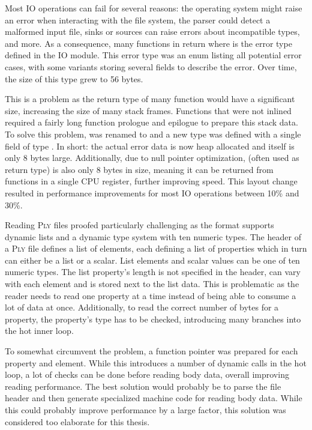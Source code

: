 Most IO operations can fail for several reasons: the operating system might raise an error when interacting with the file system, the parser could detect a malformed input file, sinks or sources can raise errors about incompatible types, and more.
As a consequence, many functions in  return  where  is the error type defined in the IO module.
This error type was an enum listing all potential error cases, with some variants storing several fields to describe the error.
Over time, the size of this type grew to 56 bytes.

This is a problem as the return type of many function would have a significant size, increasing the size of many stack frames.
Functions that were not inlined required a fairly long function prologue and epilogue to prepare this stack data.
To solve this problem,  was renamed to  and a new type  was defined with a single field of type .
In short: the actual error data is now heap allocated and  itself is only 8 bytes large.
Additionally, due to null pointer optimization,  (often used as return type) is also only 8 bytes in size, meaning it can be returned from functions in a single CPU register, further improving speed.
This layout change resulted in performance improvements for most IO operations between 10\% and 30\%.

Reading \textsc{Ply} files proofed particularly challenging as the format supports dynamic lists and a dynamic type system with ten numeric types.
The header of a \textsc{Ply} file defines a list of elements, each defining a list of properties which in turn can either be a list or a scalar.
List elements and scalar values can be one of ten numeric types.
The list property's length is not specified in the header, can vary with each element and is stored next to the list data.
This is problematic as the reader needs to read one property at a time instead of being able to consume a lot of data at once.
Additionally, to read the correct number of bytes for a property, the property's type has to be checked, introducing many branches into the hot inner loop.

To somewhat circumvent the problem, a function pointer was prepared for each property and element.
While this introduces a number of dynamic calls in the hot loop, a lot of checks can be done before reading body data, overall improving reading performance.
The best solution would probably be to parse the file header and then generate specialized machine code for reading body data.
While this could probably improve performance by a large factor, this solution was considered too elaborate for this thesis.


